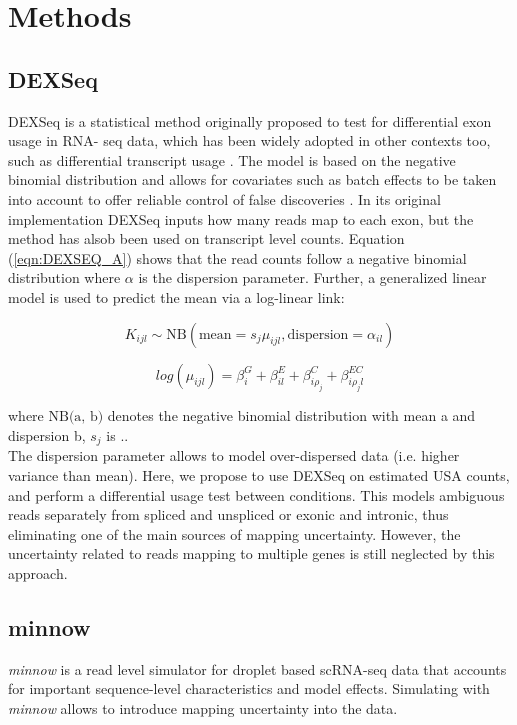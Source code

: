 

\chapter{Methods} 

\section{DEXSeq}
DEXSeq \citep{dexseq} is a statistical method originally proposed to test for differential exon usage in RNA- seq data, which has been widely adopted in other contexts too, such as differential transcript usage \citep{swimming_downstream}. The model is based on the negative binomial distribution and allows for covariates such as batch effects to be taken into account to offer reliable control of false discoveries \citep{dexseq}. In its original implementation DEXSeq inputs how many reads map to each exon, but the method has alsob been used on transcript level counts. Equation (\ref{eqn:DEXSEQ_A}) shows that the read counts follow a negative binomial distribution where $\alpha$ is the dispersion parameter. Further, a generalized linear model is used to predict the mean via a log-linear link:

\begin{equation}
K_{ijl} \sim \text{NB}(\text{mean}=s_j \mu_{ijl}, \text{dispersion}=\alpha_{il})
\label{eqn:DEXSEQ_A}
\end{equation}

\begin{equation}
log(\mu_{ijl}) = \beta^G_i + \beta^E_{il} + \beta_{i \rho_j}^C + \beta^{EC}_{i \rho_j l}
\label{eqn:DEXSEQ_B}
\end{equation}

where $\text{NB(a, b)}$ denotes the negative binomial distribution with mean a and dispersion b, $s_j$ is .. \\

The dispersion parameter allows to model over-dispersed data (i.e. higher variance than mean). Here, we propose to use DEXSeq on estimated USA counts, and perform a differential usage test between conditions. This models ambiguous reads separately from spliced and unspliced or exonic and intronic, thus eliminating one of the main sources of mapping uncertainty. However, the uncertainty related to reads mapping to multiple genes is still neglected by this approach.

\section{minnow}
\emph{minnow} is a read level simulator for droplet based scRNA-seq data that accounts for important sequence-level characteristics and model effects. Simulating with \emph{minnow} allows to introduce mapping uncertainty into the data.

